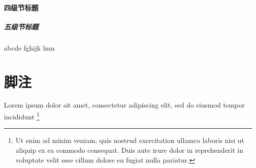 \paragraph{四级节标题}

\subparagraph{五级节标题}

abcde fghijk lmn

\section{脚注}

Lorem ipsum dolor sit amet, consectetur adipiscing elit, sed do eiusmod tempor
incididunt 
\footnote{Ut enim ad minim veniam, quis nostrud exercitation ullamco laboris
  nisi ut aliquip ex ea commodo consequat.
  Duis aute irure dolor in reprehenderit in voluptate velit esse cillum dolore
  eu fugiat nulla pariatur.}
